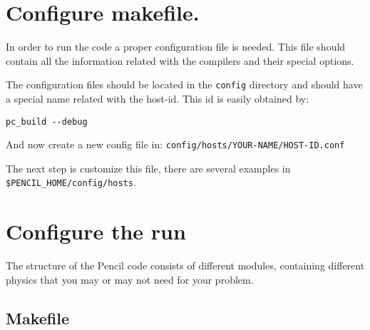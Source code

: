 \documentclass[a4paper,12pt]{article}
\begin{document}
\section{Configure makefile.}

In order to run the code a proper configuration file is needed. This file should contain all the information related with the compilers and their special options.

The configuration files should be located in the \verb|config| directory and should have a special name related with the host-id. This id is easily obtained by:  
\begin{verbatim}
pc_build --debug
\end{verbatim}
And now create a new config file in:
\texttt{config/hosts/YOUR-NAME/HOST-ID.conf}

The next step is customize this file, there are several examples in \verb|$PENCIL_HOME/config/hosts|. 



\section{Configure the run}
The structure of the Pencil code consists of different modules, containing
different physics that you may or may not need for your problem. 

\subsection{Makefile}
\end{document}
